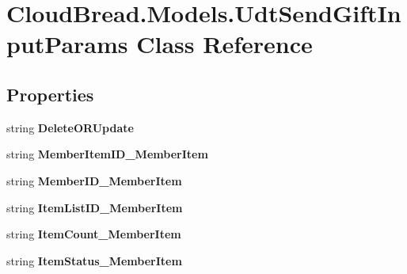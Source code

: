 \hypertarget{a00114}{}\section{Cloud\+Bread.\+Models.\+Udt\+Send\+Gift\+Input\+Params Class Reference}
\label{a00114}
\subsection*{Properties}
\begin{DoxyCompactItemize}
\item 
string {\bfseries Delete\+O\+R\+Update}\hypertarget{a00114_a92a310e8255deded9457ca3ebe0fec37}{}\label{a00114_a92a310e8255deded9457ca3ebe0fec37}

\item 
string {\bfseries Member\+Item\+I\+D\+\_\+\+Member\+Item}\hypertarget{a00114_a936b604e46e8e5939839457324ce1f34}{}\label{a00114_a936b604e46e8e5939839457324ce1f34}

\item 
string {\bfseries Member\+I\+D\+\_\+\+Member\+Item}\hypertarget{a00114_abff65dc76650e0ceb14e2333f56b123f}{}\label{a00114_abff65dc76650e0ceb14e2333f56b123f}

\item 
string {\bfseries Item\+List\+I\+D\+\_\+\+Member\+Item}\hypertarget{a00114_a729e0b6a8b781410f58b24abd8a0cb77}{}\label{a00114_a729e0b6a8b781410f58b24abd8a0cb77}

\item 
string {\bfseries Item\+Count\+\_\+\+Member\+Item}\hypertarget{a00114_aca1895445d564fecbbed92387fbe363d}{}\label{a00114_aca1895445d564fecbbed92387fbe363d}

\item 
string {\bfseries Item\+Status\+\_\+\+Member\+Item}\hypertarget{a00114_a228ebba9acaa50c1709ae6b7d4c79e7c}{}\label{a00114_a228ebba9acaa50c1709ae6b7d4c79e7c}


\end{DoxyCompactItemize}
